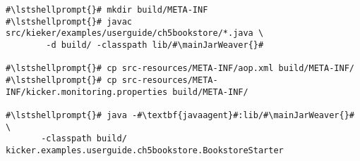 \begin{lstlisting}[caption=Commands to compile and run the Bookstore under \UnixLikeSystems, label=lst:traceAnalysisCompileRunExample1]
#\lstshellprompt{}# mkdir build/META-INF
#\lstshellprompt{}# javac src/kieker/examples/userguide/ch5bookstore/*.java \
        -d build/ -classpath lib/#\mainJarWeaver{}#

#\lstshellprompt{}# cp src-resources/META-INF/aop.xml build/META-INF/
#\lstshellprompt{}# cp src-resources/META-INF/kicker.monitoring.properties build/META-INF/

#\lstshellprompt{}# java -#\textbf{javaagent}#:lib/#\mainJarWeaver{}# \
       -classpath build/ kicker.examples.userguide.ch5bookstore.BookstoreStarter
\end{lstlisting}
